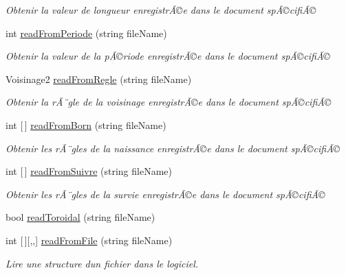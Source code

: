 \begin{DoxyCompactItemize}
\begin{DoxyCompactList}\small\item\em Obtenir la valeur de longueur enregistrÃ©e dans le document spÃ©cifiÃ© \end{DoxyCompactList}\item 
int \mbox{\hyperlink{class_local_storage_a8e862054e8b3f3c33dd64ed44d5983c4}{read\+From\+Periode}} (string file\+Name)
\begin{DoxyCompactList}\small\item\em Obtenir la valeur de la pÃ©riode enregistrÃ©e dans le document spÃ©cifiÃ© \end{DoxyCompactList}\item 
Voisinage2 \mbox{\hyperlink{class_local_storage_afbd7328c28fa47b11fcc174da3cc8ec1}{read\+From\+Regle}} (string file\+Name)
\begin{DoxyCompactList}\small\item\em Obtenir la rÃ¨gle de la voisinage enregistrÃ©e dans le document spÃ©cifiÃ© \end{DoxyCompactList}\item 
int \mbox{[}$\,$\mbox{]} \mbox{\hyperlink{class_local_storage_aa66a98dccf6cb550c5a38c25b9712898}{read\+From\+Born}} (string file\+Name)
\begin{DoxyCompactList}\small\item\em Obtenir les rÃ¨gles de la naissance enregistrÃ©e dans le document spÃ©cifiÃ© \end{DoxyCompactList}\item 
int \mbox{[}$\,$\mbox{]} \mbox{\hyperlink{class_local_storage_a0c0003569be45cff5fda794e42243c1e}{read\+From\+Suivre}} (string file\+Name)
\begin{DoxyCompactList}\small\item\em Obtenir les rÃ¨gles de la survie enregistrÃ©e dans le document spÃ©cifiÃ© \end{DoxyCompactList}\item 
bool \mbox{\hyperlink{class_local_storage_a9197311a356432fa7a9480c69f42dd9c}{read\+Toroidal}} (string file\+Name)
\item 
int \mbox{[}$\,$\mbox{]}\mbox{[},,\mbox{]} \mbox{\hyperlink{class_local_storage_a200c8f22ceed88238703411e2c0f1e05}{read\+From\+File}} (string file\+Name)
\begin{DoxyCompactList}\small\item\em Lire une structure d\textquotesingle{}un fichier dans le logiciel. \end{DoxyCompactList}\end{DoxyCompactItemize}
